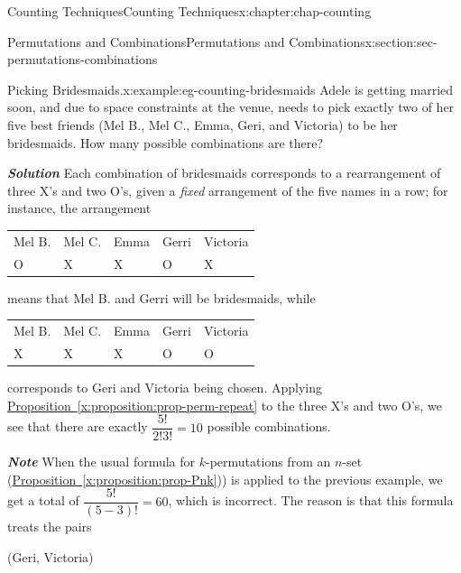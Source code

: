 \documentclass[oneside,10pt,]{book}
\newcommand{\tabularfont}{\relax}
\newcommand{\xreffont}{\relax}
\newcommand{\alert}[1]{\textbf{\textit{#1}}}
\numberwithin{equation}{section}
\begin{document}
\begin{chapterptx}{Counting Techniques}{}{Counting Techniques}{}{}{x:chapter:chap-counting}
\begin{sectionptx}{Permutations and Combinations}{}{Permutations and Combinations}{}{}{x:section:sec-permutations-combinations}
\begin{example}{Picking Bridesmaids.}{x:example:eg-counting-bridesmaids}
Adele is getting married soon, and due to space constraints at the venue, needs to pick exactly two of her five best friends (Mel B., Mel C., Emma, Geri, and Victoria) to be her bridesmaids. How many possible combinations are there?%
\par
\alert{Solution} Each combination of bridesmaids corresponds to a rearrangement of three X's and two O's, given a \emph{fixed} arrangement of the five names in a row; for instance, the arrangement%
\begin{sidebyside}{1}{0.225}{0.225}{0}%
\begin{sbspanel}{0.55}%
{\centering%
{\tabularfont%
\begin{tabular}{lllll}
Mel B.&Mel C.&Emma&Gerri&Victoria\tabularnewline[0pt]
O&X&X&O&X
\end{tabular}
}%
\par}
\end{sbspanel}%
\end{sidebyside}%
\par
means that Mel B. and Gerri will be bridesmaids, while%
\begin{sidebyside}{1}{0.225}{0.225}{0}%
\begin{sbspanel}{0.55}%
{\centering%
{\tabularfont%
\begin{tabular}{lllll}
Mel B.&Mel C.&Emma&Gerri&Victoria\tabularnewline[0pt]
X&X&X&O&O
\end{tabular}
}%
\par}
\end{sbspanel}%
\end{sidebyside}%
\par
corresponds to Geri and Victoria being chosen. Applying \hyperref[x:proposition:prop-perm-repeat]{Proposition~{\xreffont\ref{x:proposition:prop-perm-repeat}}} to the three X's and two O's, we see that there are exactly \(\dfrac{5!}{2! 3!} = 10\) possible combinations.%
\par
\alert{Note} When the usual formula for \(k\)-permutations from an \(n\)-set (\hyperref[x:proposition:prop-Pnk]{Proposition~{\xreffont\ref{x:proposition:prop-Pnk}}})) is applied to the previous example, we get a total of \(\dfrac{5!}{(5-3)!} = 60\), which is incorrect. The reason is that this formula treats the pairs%
\begin{sidebyside}{3}{0.2}{0.2}{0}%
\begin{sbspanel}{0.25}%
(Geri, Victoria)%
\end{sbspanel}%
\begin{sbspanel}{0.1}%
\par

\end{sbspanel}
\end{sidebyside}
\end{example}
\end{sectionptx}
\end{chapterptx}
\end{document}
